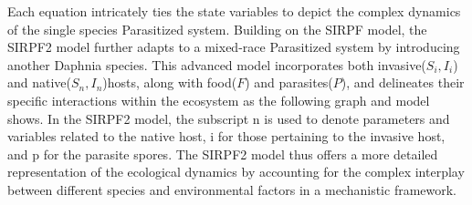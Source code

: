 \documentclass[12pt]{article}
\begin{document}
Each equation intricately ties the state variables to depict the complex dynamics of the single species Parasitized system. Building on the SIRPF model, the SIRPF2 model further adapts to a mixed-race Parasitized system by introducing another Daphnia species. This advanced model incorporates both invasive($S_i , I_i$) and native($S_n , I_n$)hosts, along with food($F$) and parasites($P$), and delineates their specific interactions within the ecosystem as the following graph and model shows. In the SIRPF2 model, the subscript n is used to denote parameters and variables related to the native host, i for those pertaining to the invasive host, and p for the parasite spores. The SIRPF2 model thus offers a more detailed representation of the ecological dynamics by accounting for the complex interplay between different species and environmental factors in a mechanistic framework.
\end{document}
